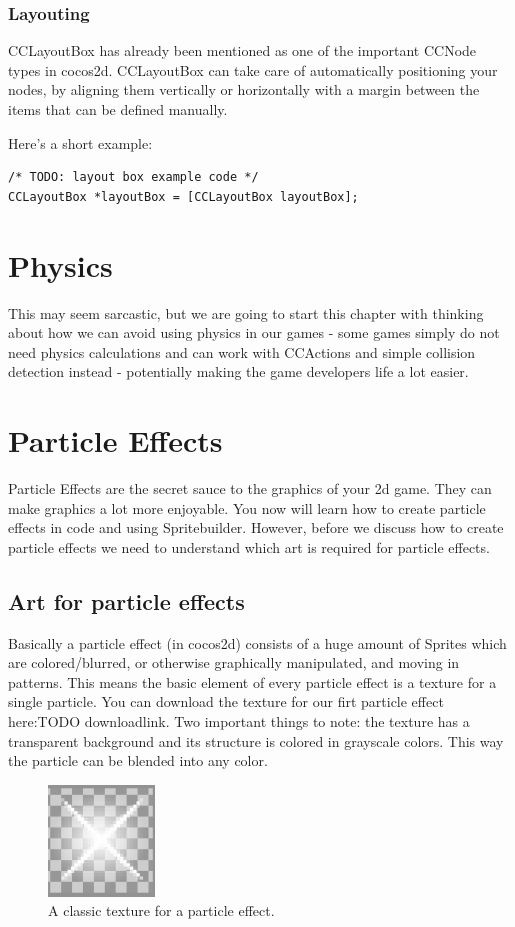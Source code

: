 \documentclass{scrreprt}
\newcommand{\cocos}{cocos2d}
\begin{document}
\subsection{Layouting}
CCLayoutBox has already been mentioned as one of the important CCNode types in
\cocos{}. CCLayoutBox can take care of automatically positioning your nodes, by
aligning them vertically or horizontally with a margin between the items that
can be defined manually.

Here's a short example:
\begin{lstlisting}
/* TODO: layout box example code */
CCLayoutBox *layoutBox = [CCLayoutBox layoutBox];
\end{lstlisting}
 

\chapter{Physics}
This may seem sarcastic, but we are going to start this chapter with thinking
about how we can avoid using physics in our games - some games simply do not
need physics calculations and can work with CCActions and simple collision
detection instead - potentially making the game developers life a lot easier.

\chapter{Particle Effects}
Particle Effects are the secret sauce to the graphics of your 2d game. They can
make graphics a lot more enjoyable. You now will learn how to create particle
effects in code and using Spritebuilder. However, before we discuss how to
create particle effects we need to understand which art is required for particle
effects.

\section{Art for particle effects}
Basically a particle effect (in \cocos{}) consists of a huge amount of Sprites
which are colored/blurred, or otherwise graphically manipulated, and moving in
patterns. This means the basic element of every particle effect is a texture for
a single particle. You can download the texture for our firt particle effect
here:TODO downloadlink. Two important things to note: the texture has a
transparent background and its structure is colored in grayscale colors. This
way the particle can be blended into any color. 
 \begin{figure}[H]
		\centering
		\includegraphics[width=80pt]{images/particle_stars.png}     
		\caption{A classic texture for a particle effect.}
\end{figure}
\end{document}
